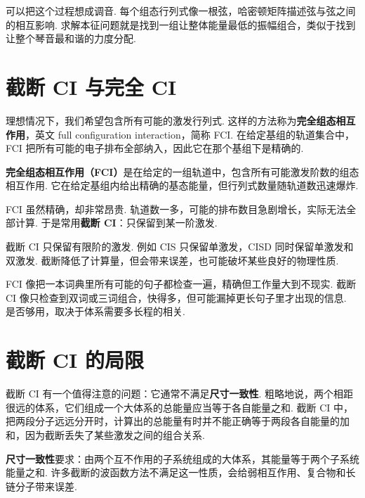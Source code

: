 \documentclass[UTF8,11pt,a4paper,openany]{ctexbook}
\newcommand{\term}[1]{\textbf{#1}}
\begin{document}
\begin{analogybox}
可以把这个过程想成调音. 每个组态行列式像一根弦，哈密顿矩阵描述弦与弦之间的相互影响. 求解本征问题就是找到一组让整体能量最低的振幅组合，类似于找到让整个琴音最和谐的力度分配. 
\end{analogybox}

\section{截断 CI 与完全 CI}

理想情况下，我们希望包含所有可能的激发行列式. 这样的方法称为\term{完全组态相互作用}，英文 full configuration interaction，简称 FCI. 在给定基组的轨道集合中，FCI 把所有可能的电子排布全部纳入，因此它在那个基组下是精确的. 

\begin{definitionbox}
\term{完全组态相互作用（FCI）}是在给定的一组轨道中，包含所有可能激发阶数的组态相互作用. 它在给定基组内给出精确的基态能量，但行列式数量随轨道数迅速爆炸. 
\end{definitionbox}

FCI 虽然精确，却非常昂贵. 轨道数一多，可能的排布数目急剧增长，实际无法全部计算. 于是常用\term{截断 CI}：只保留到某一阶激发. 

\begin{definitionbox}
截断 CI 只保留有限阶的激发. 例如 CIS 只保留单激发，CISD 同时保留单激发和双激发. 截断降低了计算量，但会带来误差，也可能破坏某些良好的物理性质. 
\end{definitionbox}

\begin{analogybox}
FCI 像把一本词典里所有可能的句子都检查一遍，精确但工作量大到不现实. 截断 CI 像只检查到双词或三词组合，快得多，但可能漏掉更长句子里才出现的信息. 是否够用，取决于体系需要多长程的相关. 
\end{analogybox}

\section{截断 CI 的局限}

截断 CI 有一个值得注意的问题：它通常不满足\term{尺寸一致性}. 粗略地说，两个相距很远的体系，它们组成一个大体系的总能量应当等于各自能量之和. 截断 CI 中，把两段分子远远分开时，计算出的总能量有时并不能正确等于两段各自能量的加和，因为截断丢失了某些激发之间的组合关系. 

\begin{definitionbox}
\term{尺寸一致性}要求：由两个互不作用的子系统组成的大体系，其能量等于两个子系统能量之和. 许多截断的波函数方法不满足这一性质，会给弱相互作用、复合物和长链分子带来误差. 
\end{definitionbox}
\end{document}

